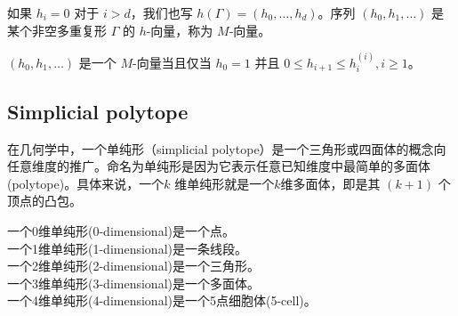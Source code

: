 \begin{definition}
如果 $ h_i = 0 $ 对于 $ i > d $，我们也写 $ h(\Gamma) = (h_0, \ldots, h_d) $。序列 $ (h_0, h_1, \ldots) $ 是某个非空多重复形 $\Gamma$ 的 $ h $-向量，称为 $ M $-向量。
\end{definition}

\begin{theoreminner}
$ (h_0, h_1, \ldots) $ 是一个 $ M $-向量当且仅当 $ h_0 = 1 $ 并且 $ 0 \leq h_{i+1} \leq h_i^{(i)}, i \geq 1 $。
\end{theoreminner}

\subsection{Simplicial polytope}

\begin{definition}
在几何学中，一个单纯形（simplicial polytope）是一个三角形或四面体的概念向任意维度的推广。命名为单纯形是因为它表示任意已知维度中最简单的多面体 (polytope)。具体来说，一个$k$ 维单纯形就是一个$k$维多面体，即是其 $(k+1)$ 个顶点的凸包。
\end{definition}
\begin{example}
一个0维单纯形(0-dimensional)是一个点。\\
一个1维单纯形(1-dimensional)是一条线段。\\
一个2维单纯形(2-dimensional)是一个三角形。\\
一个3维单纯形(3-dimensional)是一个多面体。\\
一个4维单纯形(4-dimensional)是一个5点细胞体(5-cell)。
\end{example}

